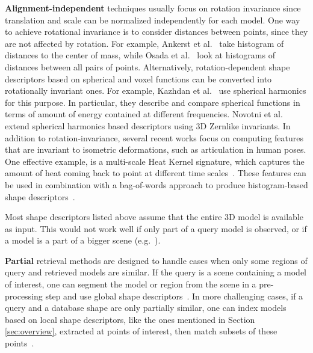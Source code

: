 \noindent \textbf{Alignment-independent}
techniques usually focus on rotation invariance since translation and scale can be normalized independently for each model. One way to achieve rotational invariance is to consider distances between points, since they are not affected by rotation. For example, Ankerst et al.~\cite{Ankerst:1999:3dsh} take histogram of distances to the center of mass, while Osada et al.~\cite{Osada:2002:sd} look at histograms of distances between all pairs of points.  Alternatively, rotation-dependent shape descriptors based on spherical and voxel functions can be converted into rotationally invariant ones. For example, Kazhdan et al.~\cite{Kazhdan:2003:RISH} use spherical harmonics for this purpose. In particular, they describe and compare spherical functions in terms of amount of energy contained at different frequencies. Novotni et al.~\cite{Novotni:2003:3DZD} extend spherical harmonics based descriptors using 3D Zernlike invariants.  In addition to rotation-invariance, several recent works focus on computing features that are invariant to isometric deformations, such as articulation in human poses. One effective example, is a multi-scale Heat Kernel signature, which captures the amount of heat coming back to point at different time scales~\cite{Sun:2009:CPI}. These features can be used in combination with a bag-of-words approach to produce histogram-based shape descriptors~\cite{Bronstein:2011:SGGW}.

Most shape descriptors listed above assume that the entire 3D model is available as input. This would not work well if only part of a query model is observed, or if a model is a part of a bigger scene (e.g.~\cite{Nan:2012:SAC}).

\noindent \textbf{Partial} retrieval methods are designed to handle cases when only some regions of query and retrieved models are similar.  If the query is a scene containing a model of interest, one can segment the model or region from the scene in a pre-processing step and use global shape descriptors~\cite{Golovinskiy:2009:SBR3D}. In more challenging cases, if a query and a database shape are only partially similar, one can index models based on local shape descriptors, like the ones mentioned in Section \ref{sec:overview}, extracted at points of interest, then match subsets of these points~\cite{Funkhouser:2006:pm3d}.

